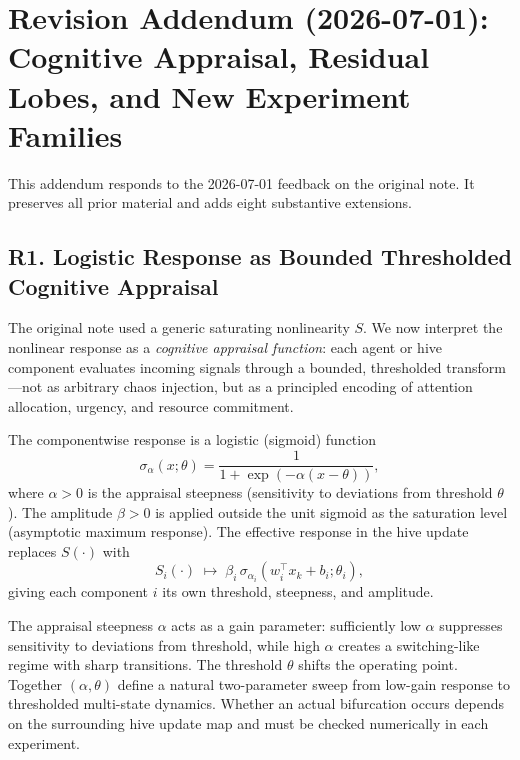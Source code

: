 
\section*{Revision Addendum (2026-07-01): Cognitive Appraisal, Residual Lobes, and New Experiment Families}

This addendum responds to the 2026-07-01 feedback on the original note.  It
preserves all prior material and adds eight substantive extensions.

\subsection*{R1. Logistic Response as Bounded Thresholded Cognitive Appraisal}

The original note used a generic saturating nonlinearity $S$.  We now interpret
the nonlinear response as a \emph{cognitive appraisal function}: each agent or
hive component evaluates incoming signals through a bounded, thresholded
transform---not as arbitrary chaos injection, but as a principled encoding of
attention allocation, urgency, and resource commitment.

\begin{definition}
The componentwise response is a logistic (sigmoid) function
\[
  \sigma_\alpha(x;\theta)=\frac{1}{1+\exp(-\alpha(x-\theta))},
\]
where $\alpha>0$ is the appraisal steepness (sensitivity to deviations from
threshold $\theta$).  The amplitude $\beta>0$ is applied outside the unit
sigmoid as the saturation level (asymptotic maximum response).  The effective
response in the hive update replaces $S(\cdot)$ with
\[
  S_i(\cdot)\;\mapsto\; \beta_i\,\sigma_{\alpha_i}(w_i^\top x_k + b_i;\theta_i),
\]
giving each component $i$ its own threshold, steepness, and amplitude.
\end{definition}

\begin{observation}
The appraisal steepness $\alpha$ acts as a gain parameter: sufficiently low
$\alpha$ suppresses sensitivity to deviations from threshold, while high
$\alpha$ creates a switching-like regime with sharp transitions.  The threshold
$\theta$ shifts the operating point.  Together $(\alpha,\theta)$ define a
natural two-parameter sweep from low-gain response to thresholded multi-state
dynamics.  Whether an actual bifurcation occurs depends on the surrounding hive
update map and must be checked numerically in each experiment.
\end{observation}

